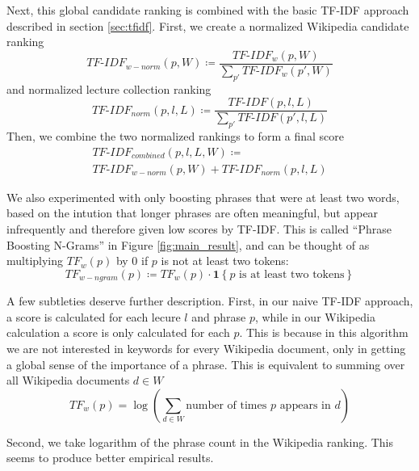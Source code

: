 Next, this global candidate ranking is combined with the basic TF-IDF approach described in section \ref{sec:tfidf}. First, we create a normalized Wikipedia candidate ranking
\begin{equation*}
TF\text{-}IDF_{w-norm}(p, W) \coloneqq \frac{TF\text{-}IDF_w(p, W)}{\sum_{p'} TF\text{-}IDF_w(p', W)}
\end{equation*}
and normalized lecture collection ranking
\begin{equation*}
TF\text{-}IDF_{norm}(p, l, L) \coloneqq \frac{TF\text{-}IDF(p, l, L)}{\sum_{p'} TF\text{-}IDF(p', l, L)}
\end{equation*}
Then, we combine the two normalized rankings to form a final score
\begin{multline*}
TF\text{-}IDF_{combined}(p, l, L, W) \coloneqq \\ TF\text{-}IDF_{w-norm}(p, W) + TF\text{-}IDF_{norm}(p, l, L)
\end{multline*}

We also experimented with only boosting phrases that were at least two words, based on the intution that longer phrases are often meaningful, but appear infrequently and therefore given low scores by TF-IDF. This is called ``Phrase Boosting N-Grams'' in Figure \ref{fig:main_result}, and can be thought of as multiplying $TF_w(p)$ by 0 if $p$ is not at least two tokens:
\begin{equation*}
TF_{w-ngram}(p) \coloneqq TF_w(p) \cdot \mathbf{1}\left\{p \text{ is at least two tokens}\right\}
\end{equation*}

A few subtleties deserve further description. First, in our naive TF-IDF approach, a score is calculated for each lecure $l$ and phrase $p$, while in our Wikipedia calculation a score is only calculated for each $p$. This is because in this algorithm we are not interested in keywords for every Wikipedia document, only in getting a global sense of the importance of a phrase. This is equivalent to summing over all Wikipedia documents $d \in W$
\begin{equation*}
TF_w(p) = \log \left(\sum_{d \in W} \text{number of times } p \text{ appears in } d\right)
\end{equation*}

Second, we take logarithm of the phrase count in the Wikipedia ranking. This seems to produce better empirical results.
